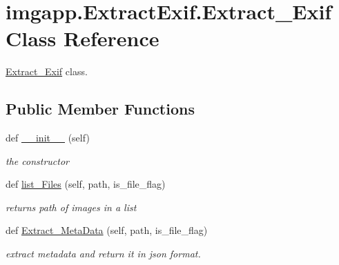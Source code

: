 \hypertarget{classimgapp_1_1ExtractExif_1_1Extract__Exif}{}\section{imgapp.\+Extract\+Exif.\+Extract\+\_\+\+Exif Class Reference}
\label{classimgapp_1_1ExtractExif_1_1Extract__Exif}


\hyperlink{classimgapp_1_1ExtractExif_1_1Extract__Exif}{Extract\+\_\+\+Exif} class.  


\subsection*{Public Member Functions}
\begin{DoxyCompactItemize}
\item 
def \hyperlink{classimgapp_1_1ExtractExif_1_1Extract__Exif_af59bbee67b855be06d4c19facad27933}{\+\_\+\+\_\+init\+\_\+\+\_\+} (self)
\begin{DoxyCompactList}\small\item\em the constructor \end{DoxyCompactList}\item 
def \hyperlink{classimgapp_1_1ExtractExif_1_1Extract__Exif_a0e8e97ec6ed9288b6c291c4e4a70b99b}{list\+\_\+\+Files} (self, path, is\+\_\+file\+\_\+flag)
\begin{DoxyCompactList}\small\item\em returns path of images in a list \end{DoxyCompactList}\item 
def \hyperlink{classimgapp_1_1ExtractExif_1_1Extract__Exif_a624582cd15b4751b3475c8690fd03e68}{Extract\+\_\+\+Meta\+Data} (self, path, is\+\_\+file\+\_\+flag)
\begin{DoxyCompactList}\small\item\em extract metadata and return it in json format. \end{DoxyCompactList}\end{DoxyCompactItemize}
